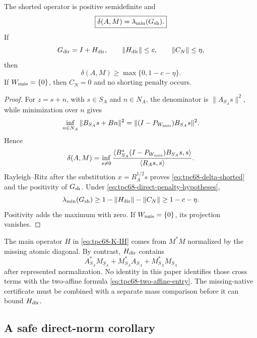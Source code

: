 \begin{theorem}
\label{thm:tpc68-direct-minus-nuisance}
The shorted operator is positive semidefinite and
\begin{equation}
 \boxed{
 \delta(A,M)=\lambda_{\min}(G_{\rm sh}).}
 \label{eq:tpc68-delta-shorted}
\end{equation}
If
\begin{equation}
 G_{\rm dir}=I+H_{\rm dir},
 \qquad
 \|H_{\rm dir}\|\le c,
 \qquad
 \|C_N\|\le\eta,
 \label{eq:tpc68-direct-penalty-hypotheses}
\end{equation}
then
\begin{equation}
 \boxed{
 \delta(A,M)\ge\max\{0,1-c-\eta\}.}
 \label{eq:tpc68-direct-penalty-bound}
\end{equation}
If \(W_{\rm nuis}=\{0\}\), then \(C_N=0\) and no shorting penalty occurs.
\end{theorem}

\begin{proof}
For \(z=s+n\), with \(s\in S_A\) and \(n\in N_A\), the denominator is
\(\|A_{S_A}s\|^2\), while minimization over \(n\) gives
\[
 \inf_{n\in N_A}\|B_{S_A}s+B n\|^2
 =\|(I-P_{W_{\rm nuis}})B_{S_A}s\|^2.
\]
Hence
\[
 \delta(A,M)
 =
 \inf_{s\ne0}
 \frac{\langle
 B_{S_A}^*(I-P_{W_{\rm nuis}})B_{S_A}s,s\rangle}
 {\langle R_As,s\rangle}.
\]
Rayleigh--Ritz after the substitution \(x=R_A^{1/2}s\) proves
\eqref{eq:tpc68-delta-shorted} and the positivity of \(G_{\rm sh}\).
Under \eqref{eq:tpc68-direct-penalty-hypotheses},
\[
 \lambda_{\min}(G_{\rm sh})
 \ge1-\|H_{\rm dir}\|-\|C_N\|
 \ge1-c-\eta.
\]
Positivity adds the maximum with zero.  If \(W_{\rm nuis}=\{0\}\), its projection
vanishes.
\end{proof}

\begin{remark}
\label{rem:tpc68-H-not-Hdir}
The main operator \(H\) in
\eqref{eq:tpc68-K-IH} comes from \(M^*M\) normalized by the missing atomic
diagonal.  By contrast, \(H_{\rm dir}\) contains
\[
 A_{S_A}^*M_{S_A}
 +M_{S_A}^*A_{S_A}
 +M_{S_A}^*M_{S_A}
\]
after represented normalization.  No identity in this paper identifies
those cross terms with the two-affine formula
\eqref{eq:tpc68-two-affine-entry}.  The missing-native certificate must be
combined with a separate mass comparison before it can bound
\(H_{\rm dir}\).
\end{remark}

\subsection{A safe direct-norm corollary}

